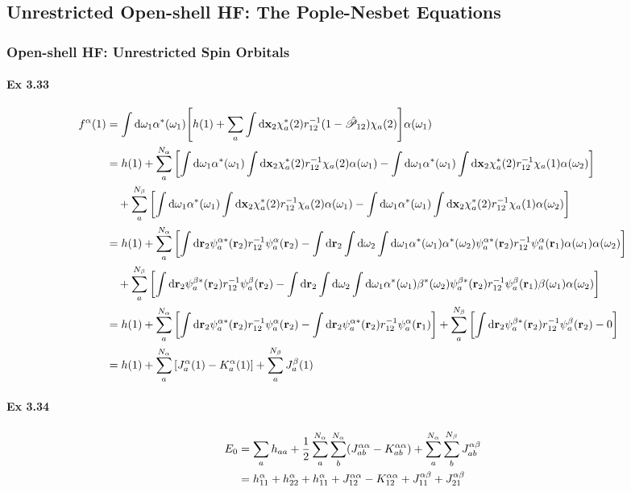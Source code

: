 \documentclass[a4paper]{article}
\newcommand{\hsP}{\hat{\mathscr{P}}}
\newcommand{\ex}[1]{\paragraph{Ex #1}}
\numberwithin{equation}{subsection}
\begin{document}
\subsection{Unrestricted Open-shell HF: The Pople-Nesbet Equations}
\subsubsection{Open-shell HF: Unrestricted Spin Orbitals}
\ex{3.33}
\begin{align}
f^\alpha(1) &= \int\dd\omega_1 \alpha^*(\omega_1) 
\qty[h(1) + \sum_a\int\dd\vb{x}_2 \chi_a^*(2)r_{12}^{-1}(1-\hsP_{12})\chi_a(2)] \alpha(\omega_1) \notag\\
&= h(1) + \sum_a^{N_\alpha} 
\qty[ \int\dd\omega_1 \alpha^*(\omega_1) \int\dd\vb{x}_2 \chi_a^*(2)r_{12}^{-1}\chi_a(2) \alpha(\omega_1) 
 - \int\dd\omega_1 \alpha^*(\omega_1) \int\dd\vb{x}_2 \chi_a^*(2)r_{12}^{-1}\chi_a(1) \alpha(\omega_2) ] \notag\\
&\quad {} + \sum_a^{N_\beta}
\qty[ \int\dd\omega_1 \alpha^*(\omega_1) \int\dd\vb{x}_2 \chi_a^*(2)r_{12}^{-1}\chi_a(2) \alpha(\omega_1) 
-  \int\dd\omega_1 \alpha^*(\omega_1) \int\dd\vb{x}_2 \chi_a^*(2)r_{12}^{-1}\chi_a(1) \alpha(\omega_2) ]  \notag\\
&= h(1) + \sum_a^{N_\alpha}
\qty[\int\dd\vb{r}_2 \psi_a^{\alpha*}(\vb{r}_2) r_{12}^{-1} \psi_a^\alpha(\vb{r}_2)
- \int\dd\vb{r}_2\int\dd\omega_2\int\dd\omega_1 
\alpha^*(\omega_1)\alpha^*(\omega_2) \psi_a^{\alpha*}(\vb{r}_2) r_{12}^{-1} \psi_a^{\alpha}(\vb{r}_1) \alpha(\omega_1) \alpha(\omega_2) ] \notag\\
&\quad {} + \sum_a^{N_\beta}\qty[\int\dd\vb{r}_2 \psi_a^{\beta*}(\vb{r}_2) r_{12}^{-1} \psi_a^\beta(\vb{r}_2)
- \int\dd\vb{r}_2\int\dd\omega_2\int\dd\omega_1 
\alpha^*(\omega_1)\beta^*(\omega_2) \psi_a^{\beta*}(\vb{r}_2) r_{12}^{-1} \psi_a^{\beta}(\vb{r}_1) \beta(\omega_1) \alpha(\omega_2) ]  \notag\\
&= h(1) + \sum_a^{N_\alpha}
\qty[\int\dd\vb{r}_2 \psi_a^{\alpha*}(\vb{r}_2) r_{12}^{-1} \psi_a^\alpha(\vb{r}_2)
- \int\dd\vb{r}_2 \psi_a^{\alpha*}(\vb{r}_2) r_{12}^{-1} \psi_a^{\alpha}(\vb{r}_1) ] 
+ \sum_a^{N_\beta} \qty[\int\dd\vb{r}_2 \psi_a^{\beta*}(\vb{r}_2)r_{12}^{-1} \psi_a^\beta(\vb{r}_2) - 0 ]  \notag\\
&= h(1) + \sum_a^{N_\alpha}\qty[J_a^\alpha(1) - K_a^{\alpha}(1) ] + \sum_a^{N_\beta} J_a^\beta(1) 
\end{align}

\ex{3.34}
\begin{align}
E_0 &= \sum_a h_{aa} + \dfrac{1}{2}\sum_a^{N_\alpha}\sum_b^{N_\alpha} (J_{ab}^{\alpha\alpha} - K_{ab}^{\alpha\alpha}) 
+ \sum_a^{N_\alpha}\sum_b^{N_\beta} J_{ab}^{\alpha\beta} \notag\\
&= h_{11}^\alpha + h_{22}^\alpha + h_{11}^\alpha + J_{12}^{\alpha\alpha} - K_{12}^{\alpha\alpha} + J_{11}^{\alpha\beta} + J_{21}^{\alpha\beta}
\end{align}
\end{document}
